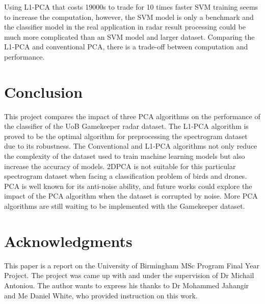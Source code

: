 \documentclass{cta-author}
\begin{document}
Using L1-PCA that costs 19000s to trade for 10 times faster SVM training seems to increase the computation, however, the SVM model is only a benchmark and the classifier model in the real application in radar result processing could be much more complicated than an SVM model and larger dataset. 
Comparing the L1-PCA and conventional PCA, there is a trade-off between computation and performance.
\section{Conclusion}\label{sec10}
This project compares the impact of three PCA algorithms on the performance of the classifier of the UoB Gamekeeper radar dataset. The L1-PCA algorithm is proved to be the optimal algorithm for preprocessing the spectrogram dataset due to its robustness. The Conventional and L1-PCA algorithms not only reduce the complexity of the dataset used to train machine learning models but also increase the accuracy of models.
2DPCA is not suitable for this particular spectrogram dataset when facing a classification problem of birds and drones.
PCA is well known for its anti-noise ability, and future works could explore the impact of the PCA algorithm when the dataset is corrupted by noise. More PCA algorithms are still waiting to be implemented with the Gamekeeper dataset.
\section{Acknowledgments}\label{sec11}
This paper is a report on the University of Birmingham MSc Program Final Year Project. The project was came up with and under the supervision of Dr Michail Antoniou. The author wants to express his thanks to Dr Mohammed Jahangir and Me Daniel White, who provided instruction on this work.
\end{document}
